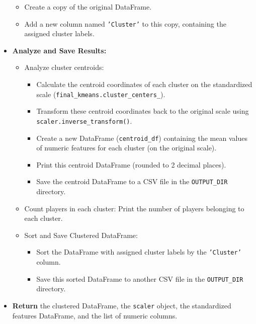 \documentclass[12pt, a4paper]{report}
\begin{document}
\begin{itemize}
\begin{itemize}
        \item Create a copy of the original DataFrame.
        \item Add a new column named \texttt{'Cluster'} to this copy, containing the assigned cluster labels.
    \end{itemize}
    \item \textbf{Analyze and Save Results:}
    \begin{itemize}
        \item Analyze cluster centroids:
        \begin{itemize}
            \item Calculate the centroid coordinates of each cluster on the standardized scale (\texttt{final\_kmeans.cluster\_centers\_}).
            \item Transform these centroid coordinates back to the original scale using \texttt{scaler.inverse\_transform()}.
            \item Create a new DataFrame (\texttt{centroid\_df}) containing the mean values of numeric features for each cluster (on the original scale).
            \item Print this centroid DataFrame (rounded to 2 decimal places).
            \item Save the centroid DataFrame to a CSV file in the \texttt{OUTPUT\_DIR} directory.
        \end{itemize}
        \item Count players in each cluster: Print the number of players belonging to each cluster.
        \item Sort and Save Clustered DataFrame:
        \begin{itemize}
            \item Sort the DataFrame with assigned cluster labels by the \texttt{'Cluster'} column.
            \item Save this sorted DataFrame to another CSV file in the \texttt{OUTPUT\_DIR} directory.
        \end{itemize}
    \end{itemize}
    \item \textbf{Return} the clustered DataFrame, the \texttt{scaler} object, the standardized features DataFrame, and the list of numeric columns.
\end{itemize}
\end{document}
